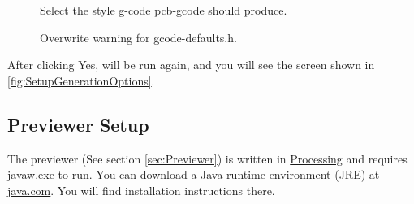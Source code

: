 \documentclass[11pt]{book}
\begin{document}
\begin{figure}
	\caption{Select the style g-code pcb-gcode should produce.}
	\label{fig:SelectGcodeStyle}
\end{figure}

\begin{figure}
	\caption{Overwrite warning for gcode-defaults.h.}
	\label{fig:GcodeDefaultsWarning}
\end{figure}

After clicking Yes,  will be run again, and you will see the screen shown in \figurename \vref{fig:SetupGenerationOptions}.

\subsection{Previewer Setup}

The previewer (See section \vref{sec:Previewer}) is written in \href{http://www.processing.org}{Processing} and requires javaw.exe to run. You can download a Java runtime environment (JRE) at \href{http://www.java.com}{java.com}. You will find installation instructions there. 
\end{document}
